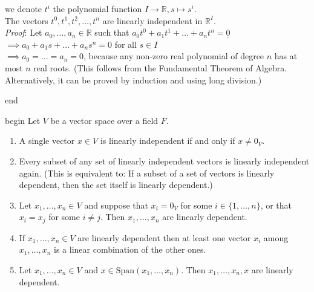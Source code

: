 \documentclass[
  12pt,
  a4paper,
  twoside]{article}
\theoremstyle{plain}
\theoremstyle{definition}
\begin{document}
\begin{enumerate}
  we denote \(t^{i}\) the polynomial function
  \(I \rightarrow \mathbb{R}, s \mapsto s^{i}\).\\
  The vectors \(t^0,t^1,t^2, \dots, t^n\) are linearly independent in \(\mathbb{R}^{I}\).\\
  \emph{Proof}: Let \(a_{0}, \dots, a_n \in \mathbb{R}\) such that \(a_{0}t^0 + a_1t^1 + \dots + a_nt^n = \underline{0}\)\\
  \hspace*{0.333em}\hspace*{0.333em}\hspace*{0.333em}\hspace*{0.333em} \(\implies a_{0} + a_1s + \dots + a_ns^n = 0\) for all \(s \in I\)\\
  \hspace*{0.333em}\hspace*{0.333em}\hspace*{0.333em}\hspace*{0.333em} \(\implies a_{0} = \dots = a_n = 0\), because any non-zero real polynomial of degree \(n\) has at most \(n\) real roots. (This follows from the Fundamental Theorem of Algebra. Alternatively, it can be proved by induction and using long division.)
\end{enumerate}

\csname end

\csname begin\label{cnj:prop-lin-indep-basics}
Let \(V\) be a vector space over a field \(F\).

\begin{enumerate}
\def\labelenumi{(\alph{enumi})}
\item
  A single vector \(x \in V\) is linearly independent if and only if \(x \neq 0_{V}\).
\item
  Every subset of any set of linearly independent vectors is linearly independent again.
  (This is equivalent to: If a subset of a set of vectors is linearly dependent, then the set
  itself is linearly dependent.)
\item
  Let \(x_1, \dots, x_n \in V\) and suppose that \(x_{i} = 0_{V}\) for some \(i \in \{1, \dots, n \}\),
  or that \(x_{i} = x_{j}\) for some \(i \neq j\). Then \(x_1, \dots, x_n\) are linearly dependent.
\item
  If \(x_1, \dots, x_n \in V\) are linearly dependent then at least one vector \(x_{i}\)
  among \(x_1, \dots, x_n\) is a linear combination of the other ones.
\item
  Let \(x_1, \dots, x_n \in V\) and \(x \in \mathrm{Span}(x_1, \dots, x_n)\).
  Then \(x_1, \dots, x_n, x\) are linearly dependent.
\end{enumerate}
\end{document}
